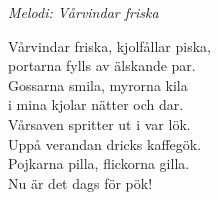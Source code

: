 {\footnotesize\textit{Melodi: Vårvindar friska}}\par
\vspace{10pt}
Vårvindar friska, kjolfållar piska,\\
portarna fylls av älskande par.\\
Gossarna smila, myrorna kila\\
i mina kjolar nätter och dar.\\
Vårsaven spritter ut i var lök.\\
Uppå verandan dricks kaffegök.\\
Pojkarna pilla, flickorna gilla.\\
Nu är det dags för pök!
